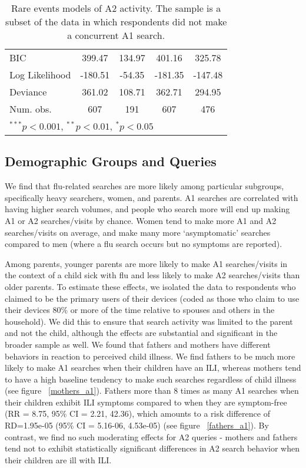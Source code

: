 \documentclass[12pt]{article}
\begin{document}
\begin{table}
\begin{center}
\begin{tabular}{l c c c c }
BIC            & 399.47         & 134.97         & 401.16         & 325.78         \\
Log Likelihood & -180.51        & -54.35         & -181.35        & -147.48        \\
Deviance       & 361.02         & 108.71         & 362.71         & 294.95         \\
Num. obs.      & 607            & 191            & 607            & 476            \\
\hline
\multicolumn{5}{l}{\scriptsize{$^{***}p<0.001$, $^{**}p<0.01$, $^*p<0.05$}}
\end{tabular}
\caption{Rare events models of A2 activity. The sample is a subset of the data in which respondents did not make a concurrent A1 search.}
\label{table:coefficients_a2}
\end{center}
\end{table}

\subsection{Demographic Groups and Queries}

We find that flu-related searches are more likely among particular subgroups, specifically heavy searchers, women, and parents. A1 searches are correlated with having higher search volumes, and people who search more will end up making A1 or A2 searches/visits by chance. Women tend to make more A1 and A2 searches/visits on average, and make many more `asymptomatic' searches compared to men (where a flu search occurs but no symptoms are reported). 

Among parents, younger parents are more likely to make A1 searches/visits in the context of a child sick with flu and less likely to make A2 searches/visits than older parents. To estimate these effects, we isolated the data to respondents who claimed to be the primary users of their devices (coded as those who claim to use their devices 80\% or more of the time relative to spouses and others in the household). We did this to ensure that search activity was limited to the parent and not the child, although the effects are substantial and significant in the broader sample as well. We found that fathers and mothers have different behaviors in reaction to perceived child illness. We find fathers to be much more likely to make A1 searches when their children have an ILI, whereas mothers tend to have a high baseline tendency to make such searches regardless of child illness (see figure ~\ref{mothers_a1}). Fathers more than 8 times as many A1 searches when their children exhibit ILI symptoms compared to when they are symptom-free (RR = 8.75, 95\% CI = 2.21, 42.36), which amounts to a risk difference of RD=1.95e-05 (95\% CI = 5.16-06, 4.53e-05) (see figure ~\ref{fathers_a1}). By contrast, we find no such moderating effects for A2 queries - mothers and fathers tend not to exhibit statistically significant differences in A2 search behavior when their children are ill with ILI.  
\end{document}
